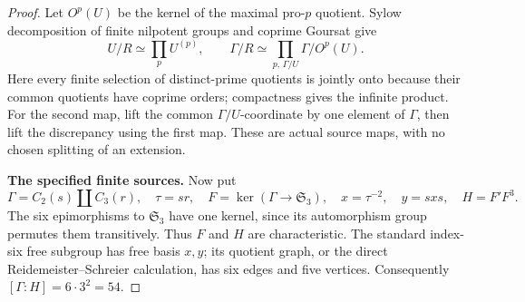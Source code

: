 \begin{proof}
Let $O^p(U)$ be the kernel of the maximal pro-$p$
quotient. Sylow decomposition of finite nilpotent
groups and coprime Goursat give
\[
 U/R\simeq\prod_p U^{(p)},\qquad
 \Gamma/R\simeq
       \prod_{p,\,\Gamma/U}\Gamma/O^p(U).
                                                               \tag{E.235}
\]
Here every finite selection of distinct-prime
quotients is jointly onto because their common
quotients have coprime orders; compactness gives
the infinite product. For the second map, lift
the common $\Gamma/U$-coordinate by one element
of $\Gamma$, then lift the discrepancy using
the first map. These are actual source maps,
with no chosen splitting of an extension.

\medskip\noindent\textbf{The specified finite sources.}
Now put
\[
 \Gamma=C_2(s)\amalg C_3(r),\quad \tau=sr,\quad
 F=\ker(\Gamma\to\mathfrak S_3),\quad
 x=\tau^{-2},\quad y=sxs,\quad H=F'F^3.
                                                               \tag{E.236}
\]
The six epimorphisms to $\mathfrak S_3$ have one
kernel, since its automorphism group permutes
them transitively. Thus $F$ and $H$ are
characteristic. The standard index-six free
subgroup has free basis $x,y$; its quotient
graph, or the direct Reidemeister--Schreier
calculation, has six edges and five vertices.
Consequently $[\Gamma:H]=6\cdot3^2=54$.


\end{proof}
